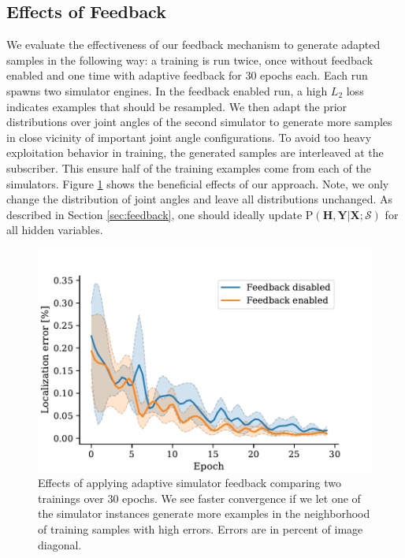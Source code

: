 \documentclass[conference]{IEEEtran}
\begin{document}
    \subsection{Effects of Feedback}
    We evaluate the effectiveness of our feedback mechanism to generate adapted samples in the following way: a training is run twice, once without feedback enabled and one time with adaptive feedback for 30 epochs each. Each run spawns two simulator engines. In the feedback enabled run, a high $L_2$ loss indicates examples that should be resampled. We then adapt the prior distributions over joint angles of the second simulator to generate more samples in close vicinity of important joint angle configurations. To avoid too heavy exploitation behavior in training, the generated samples are interleaved at the subscriber. This ensure half of the training examples come from each of the simulators. Figure \ref{fig:control} shows the beneficial effects of our approach. Note, we only change the distribution of joint angles and leave all distributions unchanged. As described in Section \ref{sec:feedback}, one should ideally update $\mathrm{P}(\textbf{H},\textbf{Y} \lvert \textbf{X};\mathcal{S})$ for all hidden variables.

    \begin{figure}[htbp]
        \centerline{\includegraphics[width=0.9\columnwidth]{figures/control/control.pdf}}
        \caption{
            \label{fig:control} Effects of applying adaptive simulator feedback comparing two trainings over 30 epochs. We see faster convergence if we let one of the simulator instances generate more examples in the neighborhood of training samples with high errors. Errors are in percent of image diagonal.
        }
    \end{figure}
\end{document}
